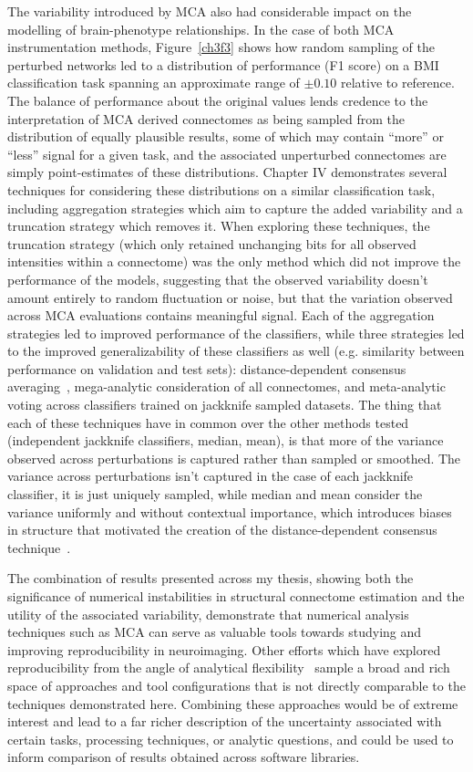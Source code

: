 The variability introduced by MCA also had considerable impact on the modelling of brain-phenotype relationships.
In the case of both MCA instrumentation methods, Figure~\ref{ch3f3} shows how random sampling of the perturbed
networks led to a distribution of performance (F1 score) on a BMI classification task spanning an approximate range
of $\pm 0.10$ relative to reference. The balance of performance about the original values lends credence to the
interpretation of MCA derived connectomes as being sampled from the distribution of equally plausible results,
some of which may contain ``more'' or ``less'' signal for a given task, and the associated unperturbed connectomes
are simply point-estimates of these distributions. Chapter IV demonstrates several techniques for considering
these distributions on a similar classification task, including aggregation strategies which aim to capture the
added variability and a truncation strategy which removes it. When exploring these techniques, the truncation
strategy (which only retained unchanging bits for all observed intensities within a connectome) was the only method
which did not improve the performance of the models, suggesting that the observed variability doesn't amount
entirely to random fluctuation or noise, but that the variation observed across MCA evaluations contains meaningful
signal. Each of the aggregation strategies led to improved performance of the classifiers, while three strategies
led to the improved generalizability of these classifiers as well (e.g. similarity between performance on validation
and test sets): distance-dependent consensus averaging~\cite{Betzel2018-eo}, mega-analytic consideration of all
connectomes, and meta-analytic voting across classifiers trained on jackknife sampled datasets. The thing that each
of these techniques have in common over the other methods tested (independent jackknife classifiers, median, mean),
is that more of the variance observed across perturbations is captured rather than sampled or smoothed. The
variance across perturbations isn't captured in the case of each jackknife classifier, it is just uniquely sampled,
while median and mean consider the variance uniformly and without contextual importance, which introduces biases in
structure that motivated the creation of the distance-dependent consensus technique~\cite{Betzel2018-eo}.

The combination of results presented across my thesis, showing both the significance of numerical instabilities in
structural connectome estimation and the utility of the associated variability, demonstrate that numerical analysis
techniques such as MCA can serve as valuable tools towards studying and improving reproducibility in neuroimaging.
Other efforts which have explored reproducibility from the angle of analytical
flexibility~\cite{botvinik2020variability,schilling2020tractograph} sample a broad and rich space of approaches and
tool configurations that is not directly comparable to the techniques demonstrated here. Combining these approaches
would be of extreme interest and lead to a far richer description of the uncertainty associated with certain tasks,
processing techniques, or analytic questions, and could be used to inform comparison of results obtained across
software libraries.

